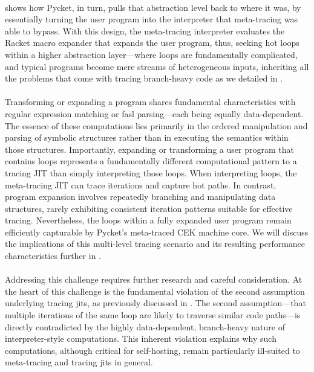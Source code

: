 			\paragraph{}%
				 shows how Pycket, in turn, pulls that abstraction level back to where it was, by essentially turning the user program into the interpreter that meta-tracing was able to bypass. With this design, the meta-tracing interpreter evaluates the Racket macro expander that expands the user program, thus, seeking hot loops within a higher abstraction layer—where loops are fundamentally complicated, and typical programs become mere streams of heterogeneous inputs, inheriting all the problems that come with tracing branch-heavy code as we detailed in .

			\paragraph{}%
  				Transforming or expanding a program shares fundamental characteristics with regular expression matching or \gls{fasl} parsing—each being equally data-dependent. The essence of these computations lies primarily in the ordered manipulation and parsing of symbolic structures rather than in executing the semantics within those structures. Importantly, expanding or transforming a user program that contains loops represents a fundamentally different computational pattern to a tracing JIT than simply interpreting those loops. When interpreting loops, the meta-tracing JIT can trace iterations and capture hot paths. In contrast, program expansion involves repeatedly branching and manipulating data structures, rarely exhibiting consistent iteration patterns suitable for effective tracing. Nevertheless, the loops within a fully expanded user program remain efficiently capturable by Pycket's meta-traced CEK machine core. We will discuss the implications of this multi-level tracing scenario and its resulting performance characteristics further in .

			\paragraph{}%
				Addressing this challenge requires further research and careful consideration. At the heart of this challenge is the fundamental violation of the second assumption underlying tracing \glspl{jit}, as previously discussed in . The second assumption—that multiple iterations of the same loop are likely to traverse similar code paths—is directly contradicted by the highly data-dependent, branch-heavy nature of interpreter-style computations. This inherent violation explains why such computations, although critical for self-hosting, remain particularly ill-suited to meta-tracing and tracing \glspl{jit} in general.


